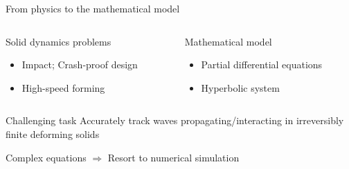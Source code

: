 \begin{withoutheadline}
\begin{frame}{From physics to the mathematical model}
\begin{overprint}
    \begin{columns}
      \begin{column}{0.45\textwidth}
        \begin{block}{Solid dynamics problems}
          \begin{itemize}
          \item[] Impact; Crash-proof design
          \item[] High-speed forming
          \end{itemize}
        \end{block}
      \end{column}
      
      
      \begin{column}{0.55\textwidth}
        \begin{block}{Mathematical model}
          \begin{itemize}
          \item[] Partial differential equations
          \item[] Hyperbolic system
          \end{itemize}
        \end{block}
      \end{column}
    \end{columns}

    \vspace{1.cm}
    \begin{block}{Challenging task}
      \alert{Accurately track waves propagating/interacting in irreversibly finite deforming solids }
    \end{block}

    \vspace{0.5cm}
    \begin{block}{Complex equations $\Rightarrow$ Resort to numerical simulation}
      
    \end{block}
  \end{overprint}
\end{frame}\end{withoutheadline}


